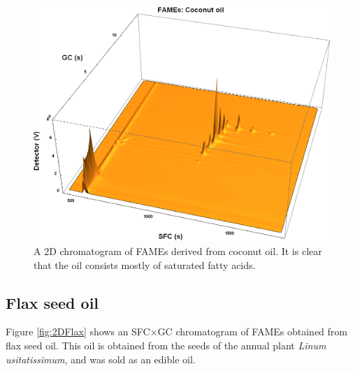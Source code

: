 \begin{figure}
\centering
\includegraphics[width=\textwidth]{Figures/Coconut.png}
\decoRule

\caption[SFC×GC of coconut oil]{A 2D chromatogram of FAMEs derived from
coconut oil. It is clear that the oil consists mostly of saturated fatty
acids.}

\label{fig:2DCoconut}
\end{figure}

\subsection{Flax seed oil}

Figure \ref{fig:2DFlax} shows an SFC×GC chromatogram of FAMEs obtained from flax
seed oil. This oil is obtained from the seeds of the annual plant \textit{Linum
usitatissimum}, and was sold as an edible oil.


